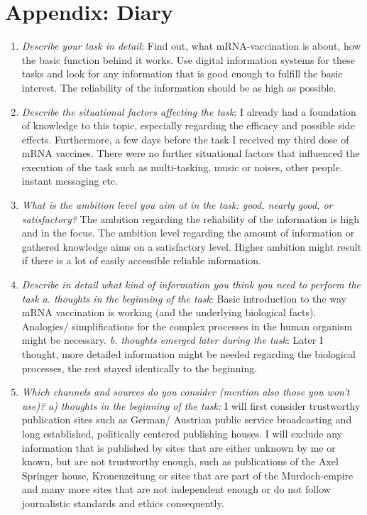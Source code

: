 \documentclass[11pt,letterpaper]{article}
\begin{document}
\section*{Appendix: Diary}
\begin{enumerate}
\item \textit{Describe your task in detail}: Find out, what mRNA-vaccination is about, how the basic function behind it works. Use digital information systems for these tasks and look for any information that is good enough to fulfill the basic interest. The reliability of the information should be as high as possible.
\item \textit{Describe the situational factors affecting the task}: I already had a foundation of knowledge to this topic, especially regarding the efficacy and possible side effects. Furthermore, a few days before the task I received my third dose of mRNA vaccines. There were no further situational factors that influenced the execution of the task such as multi-tasking, music or noises, other people. instant messaging etc.
\item \textit{What is the ambition level you aim at in the task:  good, nearly good, or satisfactory?} The ambition regarding the reliability of the information is high and in the focus. The ambition level regarding the amount of information or gathered knowledge aims on a satisfactory level. Higher ambition might result if there is a lot of easily accessible reliable information.
\item \textit{Describe in detail what kind of information you think you need to perform the task} \newline
\textit{a. thoughts in the beginning of the task}: Basic introduction to the way mRNA vaccination is working (and the underlying biological facts). Analogies/ simplifications for the complex processes in the human organism might be necessary.\newline
\textit{b. thoughts emerged later during the task}: Later I thought, more detailed information might be needed regarding the biological processes, the rest stayed identically to the beginning.
\item \textit{Which channels and sources do you consider (mention also those you won't use)?} \newline
\textit{a) thoughts in the beginning of the task:} I will first consider trustworthy publication sites such as German/ Austrian public service broadcasting and long established, politically centered publishing houses. I will exclude any information that is published by sites that are either unknown by me or known, but are not trustworthy enough, such as publications of the Axel Springer house, Kronenzeitung or sites that are part of the Murdoch-empire and many more sites that are not independent enough or do not follow journalistic standards and ethics consequently. \newline

\end{enumerate}
\end{document}
